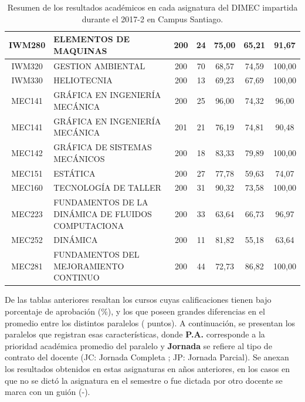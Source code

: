 \documentclass[12pt]{article}
\begin{document}
\begin{table}[H]
{\begin{tabular}{|c|l|c|c|c|c|c|}
\rowcolor[HTML]{DAEBFB} 
IWM280 & ELEMENTOS DE MAQUINAS & 200 & 24 & 75,00 & 65,21 & 91,67 \\ \hline
\rowcolor[HTML]{DAEBFB} 
IWM320 & GESTION AMBIENTAL & 200 & 70 & 68,57 & 74,59 & 100,00 \\ \hline
\rowcolor[HTML]{DAEBFB} 
IWM330 & HELIOTECNIA & 200 & 13 & 69,23 & 67,69 & 100,00 \\ \hline
\rowcolor[HTML]{DAEBFB} 
MEC141 & GRÁFICA EN INGENIERÍA MECÁNICA & 200 & 25 & 96,00 & 74,32 & 96,00 \\ \hline
\rowcolor[HTML]{DAEBFB} 
MEC141 & GRÁFICA EN INGENIERÍA MECÁNICA & 201 & 21 & 76,19 & 74,81 & 90,48 \\ \hline
\rowcolor[HTML]{DAEBFB} 
MEC142 & GRÁFICA DE SISTEMAS MECÁNICOS & 200 & 18 & 83,33 & 79,89 & 100,00 \\ \hline
\rowcolor[HTML]{DAEBFB} 
MEC151 & ESTÁTICA & 200 & 27 & 77,78 & 59,63 & 74,07 \\ \hline
\rowcolor[HTML]{DAEBFB} 
MEC160 & TECNOLOGÍA DE TALLER & 200 & 31 & 90,32 & 73,58 & 100,00 \\ \hline
\rowcolor[HTML]{DAEBFB} 
MEC223 & FUNDAMENTOS DE LA DINÁMICA DE FLUIDOS COMPUTACIONA & 200 & 33 & 63,64 & 66,73 & 96,97 \\ \hline
\rowcolor[HTML]{DAEBFB} 
MEC252 & DINÁMICA & 200 & 11 & 81,82 & 55,18 & 63,64 \\ \hline
\rowcolor[HTML]{DAEBFB} 
MEC281 & FUNDAMENTOS DEL MEJORAMIENTO CONTINUO & 200 & 44 & 72,73 & 86,82 & 100,00 \\ \hline
\end{tabular}}
\caption{Resumen de los resultados académicos en cada asignatura del DIMEC impartida durante el 2017-2 en Campus Santiago.}
\label{table:resumenCS}
\end{table}



\begin{text}
De las tablas anteriores resaltan los cursos cuyas calificaciones tienen bajo porcentaje de aprobación (\%), y los que poseen grandes diferencias en el promedio entre los distintos paralelos ( puntos). A continuación, se presentan los paralelos que registran esas características, donde \textbf{P.A.} corresponde a la prioridad académica promedio del paralelo y \textbf{Jornada} se refiere al tipo de contrato del docente (JC: Jornada Completa ; JP: Jornada Parcial). Se anexan los resultados obtenidos en estas asignaturas en años anteriores, en los casos en que no se dictó la asignatura en el semestre o fue dictada por otro docente se marca con un guión (-). 
\end{text}
\end{document}
